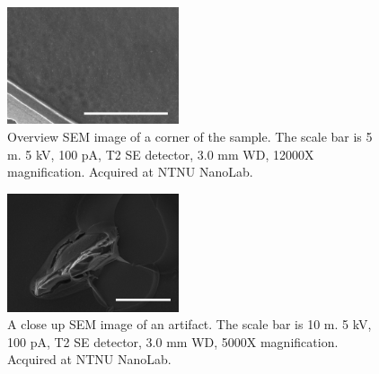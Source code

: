 \begin{figure}[ht]
    \centering
    \includegraphics[width=0.45\textwidth]{figures/sem_high_res_5um.jpg}
    \caption{Overview SEM image of a corner of the sample.
        The scale bar is 5 \textmu m.
        5 kV, 100 pA, T2 SE detector, 3.0 mm WD, 12000X magnification.
        Acquired at NTNU NanoLab.
    }
    \label{fig:sem_high_res}
\end{figure}

\begin{figure}[ht]
    \centering
    \includegraphics[width=0.45\textwidth]{figures/sem_artifact_10um.jpg}
    \caption{A close up SEM image of an artifact.
        The scale bar is 10 \textmu m.
        5 kV, 100 pA, T2 SE detector, 3.0 mm WD, 5000X magnification.
        Acquired at NTNU NanoLab.
    }
    \label{fig:sem_artifact}
\end{figure}
